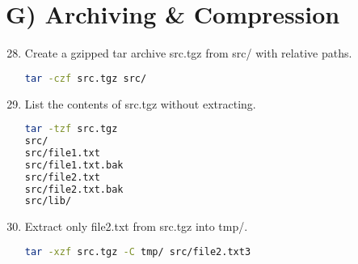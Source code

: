 \section*{G) Archiving \& Compression}
\begin{enumerate}
\setcounter{enumi}{27}
\item Create a gzipped tar archive src.tgz from src/ with relative paths. \vspace{2em}\\
\begin{lstlisting}[language=sh]
tar -czf src.tgz src/
\end{lstlisting}
\item List the contents of src.tgz without extracting. \vspace{2em}\\
\begin{lstlisting}[language=sh]
tar -tzf src.tgz
src/
src/file1.txt
src/file1.txt.bak
src/file2.txt
src/file2.txt.bak
src/lib/
\end{lstlisting}
\item Extract only file2.txt from src.tgz into tmp/. \vspace{2em}\\
\begin{lstlisting}[language=sh]
tar -xzf src.tgz -C tmp/ src/file2.txt3
\end{lstlisting}
\end{enumerate}

